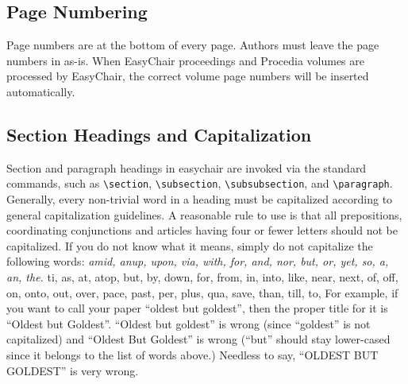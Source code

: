 \documentclass{easychair}
\newcommand{\easychair}{\textsf{easychair}}
\begin{document}
\subsection{Page Numbering}
\label{sect:page-numbering}

Page numbers are at the bottom of every page. Authors must leave the
page numbers in as-is. When EasyChair proceedings and Procedia volumes are processed by
EasyChair, the correct volume page numbers will be inserted
automatically.

\subsection{Section Headings and Capitalization}
\label{sect:section-headings}

Section and paragraph headings in {\easychair} are invoked via the standard 
commands, such as
\verb+\section+,
\verb+\subsection+,
\verb+\subsubsection+, and
\verb+\paragraph+.
Generally, every non-trivial word in a heading must be capitalized according to
general capitalization guidelines. A reasonable rule to use is that
all prepositions, coordinating conjunctions and articles having four
or fewer letters should not be capitalized. If you do not know what it
means, simply do not capitalize the following words:
\textit{amid, anup, upon, via, with, for, and, nor, but, or,
yet, so, a, an, the.} ti, as, at, atop, but, by, down, for, from, in, into, like,
near, next, of, off, on, onto, out, over, pace, past, per, plus, qua,
save, than, till, to, For example, if you want to call your paper
``oldest but goldest'', then the proper title for it is ``Oldest but
Goldest''. ``Oldest but goldest'' is wrong (since ``goldest'' is not
capitalized) and ``Oldest But Goldest'' is wrong (``but'' should stay
lower-cased since it belongs to the list of words above.) Needless to
say, ``OLDEST BUT GOLDEST'' is very wrong.
\end{document}
